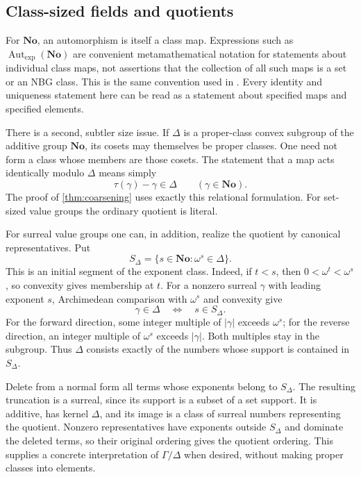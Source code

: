 \documentclass[11pt]{article}
\theoremstyle{definition}
\theoremstyle{remark}
\newcommand{\No}{\mathbf{No}}
\newcommand{\abs}[1]{\lvert #1\rvert}
\newcommand{\Gexp}{\operatorname{Aut}_{\exp}}
\numberwithin{equation}{section}
\begin{document}
\subsection{Class-sized fields and quotients}

For $\No$, an automorphism is itself a class map. Expressions such as
$\Gexp(\No)$ are convenient metamathematical notation for statements about
individual class maps, not assertions that the collection of all such maps
is a set or an NBG class. This is the same convention used in
\cite[Remark~2.1]{KKS}. Every identity and uniqueness statement here can be
read as a statement about specified maps and specified elements.

There is a second, subtler size issue. If $\Delta$ is a proper-class convex
subgroup of the additive group $\No$, its cosets may themselves be proper
classes. One need not form a class whose members are those cosets.
The statement that a map acts identically modulo $\Delta$ means simply
\begin{equation}\label{eq:relational-quotient}
 \tau(\gamma)-\gamma\in\Delta\qquad(\gamma\in\No).
\end{equation}
The proof of \cref{thm:coarsening} uses exactly this relational formulation.
For set-sized value groups the ordinary quotient is literal.

For surreal value groups one can, in addition, realize the quotient by
canonical representatives. Put
\[
 S_\Delta=\{s\in\No:\omega^s\in\Delta\}.
\]
This is an initial segment of the exponent class. Indeed, if $t<s$,
then $0<\omega^t<\omega^s$, so convexity gives membership at $t$.
For a nonzero surreal $\gamma$ with leading exponent $s$, Archimedean
comparison with $\omega^s$ and convexity give
\begin{equation}\label{eq:Delta-support}
 \gamma\in\Delta\quad\Longleftrightarrow\quad s\in S_\Delta.
\end{equation}
For the forward direction, some integer multiple of $\abs\gamma$
exceeds $\omega^s$; for the reverse direction, an integer multiple of
$\omega^s$ exceeds $\abs\gamma$. Both multiples stay in the subgroup.
Thus $\Delta$ consists exactly of the numbers whose support is contained
in $S_\Delta$.

Delete from a normal form all terms whose exponents belong to $S_\Delta$.
The resulting truncation is a surreal, since its support is a subset of a
set support. It is additive, has kernel $\Delta$, and its image is a class
of surreal numbers representing the quotient. Nonzero representatives
have exponents outside $S_\Delta$ and dominate the deleted terms, so their
original ordering gives the quotient ordering. This supplies a concrete
interpretation of $\Gamma/\Delta$ when desired, without making proper
classes into elements.
\end{document}
